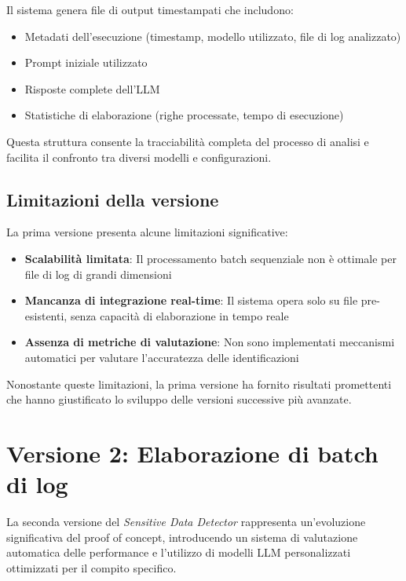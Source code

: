 \documentclass[12pt]{report}
\begin{document}
Il sistema genera file di output timestampati che includono:
\begin{itemize}
    \item Metadati dell'esecuzione (timestamp, modello utilizzato, file di log analizzato)
    \item Prompt iniziale utilizzato
    \item Risposte complete dell'LLM
    \item Statistiche di elaborazione (righe processate, tempo di esecuzione)
\end{itemize}

Questa struttura consente la tracciabilità completa del processo di analisi e facilita il confronto tra diversi modelli e configurazioni.

\subsection{Limitazioni della versione}
\label{subsec:ver1_limitazioni}

La prima versione presenta alcune limitazioni significative:

\begin{itemize}
    \item \textbf{Scalabilità limitata}: Il processamento batch sequenziale non è ottimale per file di log di grandi dimensioni
    \item \textbf{Mancanza di integrazione real-time}: Il sistema opera solo su file pre-esistenti, senza capacità di elaborazione in tempo reale
    \item \textbf{Assenza di metriche di valutazione}: Non sono implementati meccanismi automatici per valutare l'accuratezza delle identificazioni
\end{itemize}

Nonostante queste limitazioni, la prima versione ha fornito risultati promettenti che hanno giustificato lo sviluppo delle versioni successive più avanzate.

\section{Versione 2: Elaborazione di batch di log}
\label{sec:ver2}

La seconda versione del \textit{Sensitive Data Detector} rappresenta un'evoluzione significativa del proof of concept, introducendo un sistema di valutazione automatica delle performance e l'utilizzo di modelli LLM personalizzati ottimizzati per il compito specifico.
\end{document}
